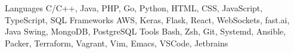 
\begin{cvskills}
  \cvskill
    {Languages}
    {C/C++, Java, PHP, Go, Python, HTML, CSS, JavaScript, TypeScript, SQL}
  \cvskill
    {Frameworks}
    {AWS, Keras, Flask, React, WebSockets, fast.ai, Java Swing, MongoDB, PostgreSQL}
  \cvskill
    {Tools}
    {Bash, Zsh, Git, Systemd, Ansible, Packer, Terraform, Vagrant, Vim, Emacs, VSCode, Jetbrains}
\end{cvskills}
